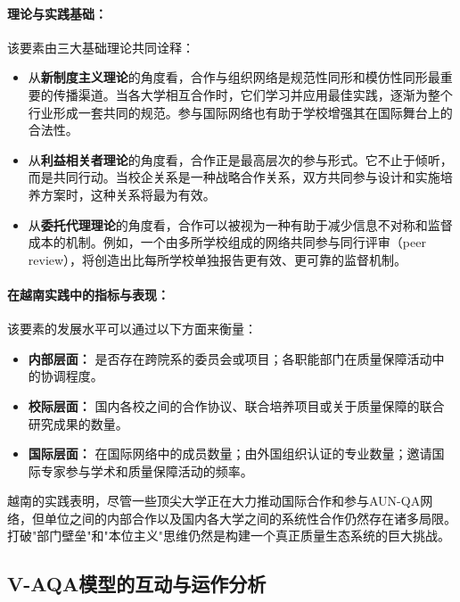\paragraph{理论与实践基础：}
该要素由三大基础理论共同诠释：
\begin{itemize}
    \item 从\textbf{新制度主义理论}的角度看，合作与组织网络是规范性同形和模仿性同形最重要的传播渠道。当各大学相互合作时，它们学习并应用最佳实践，逐渐为整个行业形成一套共同的规范。参与国际网络也有助于学校增强其在国际舞台上的合法性。
    \item 从\textbf{利益相关者理论}的角度看，合作正是最高层次的参与形式。它不止于倾听，而是共同行动。当校企关系是一种战略合作关系，双方共同参与设计和实施培养方案时，这种关系将最为有效。
    \item 从\textbf{委托代理理论}的角度看，合作可以被视为一种有助于减少信息不对称和监督成本的机制。例如，一个由多所学校组成的网络共同参与同行评审（peer review），将创造出比每所学校单独报告更有效、更可靠的监督机制。
\end{itemize}

\paragraph{在越南实践中的指标与表现：}
该要素的发展水平可以通过以下方面来衡量：
\begin{itemize}
    \item \textbf{内部层面：} 是否存在跨院系的委员会或项目；各职能部门在质量保障活动中的协调程度。
    \item \textbf{校际层面：} 国内各校之间的合作协议、联合培养项目或关于质量保障的联合研究成果的数量。
    \item \textbf{国际层面：} 在国际网络中的成员数量；由外国组织认证的专业数量；邀请国际专家参与学术和质量保障活动的频率。
\end{itemize}
越南的实践表明，尽管一些顶尖大学正在大力推动国际合作和参与AUN-QA网络，但单位之间的内部合作以及国内各大学之间的系统性合作仍然存在诸多局限。打破"部门壁垒"和"本位主义"思维仍然是构建一个真正质量生态系统的巨大挑战。

\subsection{V-AQA模型的互动与运作分析}
\label{subsec:tuong_tac_V-AQA}

